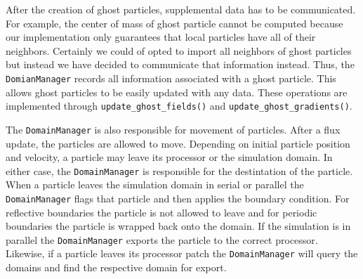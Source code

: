 After the creation of ghost particles, supplemental data has to be communicated. 
For example, the center of mass of ghost particle cannot be computed because our implementation
only guarantees that local particles have all of their neighbors. Certainly we could of opted to import all 
neighbors of ghost particles but instead we have decided to communicate that information instead. Thus, the 
\lstinline{DomianManager} records all information associated with a ghost particle. This allows ghost 
particles to be easily updated with any data. These operations are implemented through 
\lstinline{update_ghost_fields()} and \lstinline{update_ghost_gradients()}.

The \lstinline{DomainManager} is also responsible for movement of particles.
After a flux update, the particles are allowed to move. Depending on initial particle position and
velocity, a particle may leave its processor or the simulation domain. In either case, the 
\lstinline{DomainManager} is responsible for the destintation of the particle.
When a particle leaves the simulation domain in serial or parallel the \lstinline{DomainManager}
flags that particle and then applies the boundary condition. For reflective boundaries the particle is not
allowed to leave and for periodic boundaries the particle is wrapped back onto the domain. If the simulation
is in parallel the \lstinline{DomainManager} exports the particle to the correct processor. Likewise,
if a particle leaves its processor patch the \lstinline{DomainManager}
will query the domains and find the respective domain for export.

